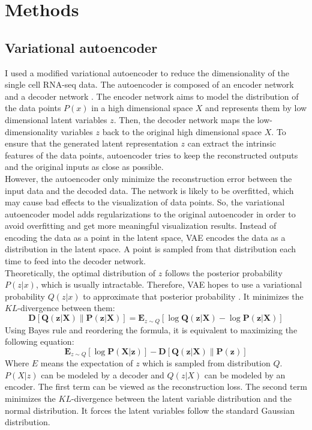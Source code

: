 \section{Methods}
\subsection{Variational autoencoder}
I used a modified variational autoencoder \cite{Kingma2014} to reduce the dimensionality of the single cell RNA-seq data. The autoencoder is composed of an encoder network and a decoder network \cite{wang2016auto}. The encoder network aims to model the distribution of the data points $P(x)$ in a high dimensional space $X$ and represents them by low dimensional latent variables $z$. Then, the decoder network maps the low-dimensionality variables $z$ back to the original high dimensional space $X$. To ensure that the generated latent representation $z$ can extract the intrinsic features of the data points, autoencoder tries to keep the reconstructed outputs and the original inputs as close as possible. \\
However, the autoencoder only minimize the reconstruction error between the input data and the decoded data. The network is likely to be overfitted, which may cause bad effects to the visualization of data points. So, the variational autoencoder model adds regularizations to the original autoencoder in order to avoid overfitting and get more meaningful visualization results. Instead of encoding the data as a point in the latent space, VAE encodes the data as a distribution in the latent space. A point is sampled from that distribution each time to feed into the decoder network. \\
Theoretically, the optimal distribution of $z$ follows the posterior probability $P(z|x)$, which is usually intractable. Therefore, VAE hopes to use a variational probability $Q(z|x)$ to approximate that posterior probability \cite{doersch2016tutorial}. It minimizes the $KL$-divergence between them:
\begin{equation}
\boldsymbol{D}[\boldsymbol{Q}(\boldsymbol{z} | \boldsymbol{X}) \| \boldsymbol{P}(\boldsymbol{z} | \boldsymbol{X})]=\mathbf{E}_{z \sim Q}[\log \boldsymbol{Q}(\boldsymbol{z} | \boldsymbol{X})-\log \boldsymbol{P}(\boldsymbol{z} | \boldsymbol{X})]
\end{equation}
Using Bayes rule and reordering the formula, it is equivalent to maximizing the following equation:
\begin{equation}
\mathbf{E}_{z \sim Q}[\log \boldsymbol{P}(\boldsymbol{X} | \boldsymbol{z})]-\boldsymbol{D}[\boldsymbol{Q}(\boldsymbol{z} | \boldsymbol{X}) \| \boldsymbol{P}(\boldsymbol{z})]
\end{equation}
Where $E$ means the expectation of $z$ which is sampled from distribution $Q$. $P(X|z)$ can be modeled by a decoder and $Q(z|X)$ can be modeled by an encoder. The first term can be viewed as the reconstruction loss. The second term minimizes the $KL$-divergence between the latent variable distribution and the normal distribution. It forces the latent variables follow the standard Gaussian distribution.
